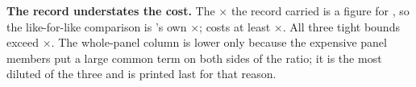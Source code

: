 \textbf{The record understates the cost.} The \vsevenCostRecorded$\times$ the record carried is a
figure for \fcheap{}, so the like-for-like comparison is \fcheap{}'s own
\vsevenCostFcheapTight$\times$; \frozen{} costs at least \vsevenCostFrozenTight$\times$. All three
tight bounds exceed \vsevenCostRecorded$\times$. The whole-panel column is lower only because the expensive panel members
put a large common term on both sides of the ratio; it is the most diluted of the three and is printed
last for that reason.
